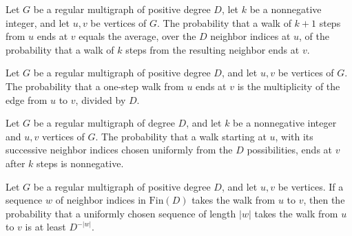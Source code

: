 \begin{theorem}
\label{Randomized.RegularMultigraph.transProb_succ}
\leanok
{}
Let $G$ be a regular multigraph of positive degree $D$, let $k$ be a nonnegative
integer, and let $u,v$ be vertices of $G$. The probability that a walk of $k+1$ steps
from $u$ ends at $v$ equals the average, over the $D$ neighbor indices at $u$, of the
probability that a walk of $k$ steps from the resulting neighbor ends at $v$.
\end{theorem}

\begin{theorem}
\label{Randomized.RegularMultigraph.transProb_one}
\leanok
{}
Let $G$ be a regular multigraph of positive degree $D$, and let $u,v$ be vertices of
$G$. The probability that a one-step walk from $u$ ends at $v$ is the multiplicity of
the edge from $u$ to $v$, divided by $D$.
\end{theorem}

\begin{theorem}
\label{Randomized.RegularMultigraph.transProb_nonneg}
\leanok
{}
Let $G$ be a regular multigraph of degree $D$, and let $k$ be a nonnegative integer and
$u,v$ vertices of $G$. The probability that a walk starting at $u$, with its successive
neighbor indices chosen uniformly from the $D$ possibilities, ends at $v$ after $k$
steps is nonnegative.
\end{theorem}

\begin{theorem}
\label{Randomized.RegularMultigraph.one_div_pow_le_transProb}
\leanok
{}
Let $G$ be a regular multigraph of positive degree $D$, and let $u,v$ be vertices. If a
sequence $w$ of neighbor indices in $\mathrm{Fin}(D)$ takes the walk from $u$ to $v$,
then the probability that a uniformly chosen sequence of length $|w|$ takes the walk
from $u$ to $v$ is at least $D^{-|w|}$.
\end{theorem}

